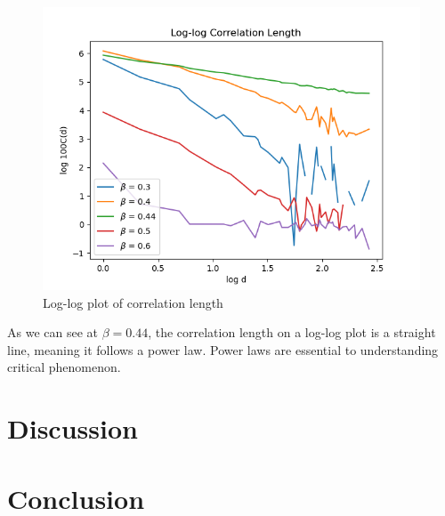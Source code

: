 \documentclass{article}
\begin{document}
\begin{figure}[ht]
    \includegraphics[width=\columnwidth]{plots/log_log_corr_len.png}
    \caption{Log-log plot of correlation length}
    \label{fig:6}
\end{figure}

As we can see at $\beta=0.44$, the correlation length on a log-log plot is a straight line, meaning it follows
a power law. Power laws are essential to understanding critical phenomenon. 


\section{Discussion}

\section{Conclusion}
\end{document}
